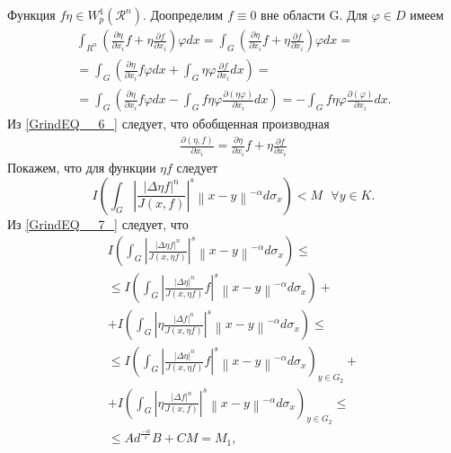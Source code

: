 Функция $f\eta \in W^1_p({\mathcal{R}}^n)$. Доопределим $f\equiv 0$ вне области G. Для $\varphi \in D$ имеем
\begin{equation} \label{GrindEQ__6_}
    \begin{gathered}
    \int_{R^{n} }\left(\frac{\partial \eta }{\partial x_{i} } f+\eta \frac{\partial f}{\partial x_{i} } \right) \varphi dx
    = \int _{G}\left(\frac{\partial \eta }{\partial x_{i} } f+\eta \frac{\partial f}{\partial x_{i} } \right) \varphi dx= \\
    = \int _{G}\left(\frac{\partial \eta }{\partial x_{i} } f\varphi dx+\int _{G}\eta \varphi \frac{\partial f}{\partial x_{i} } dx \right) = \\
    = \int _{G}\left(\frac{\partial \eta }{\partial x_{i} } f\varphi dx-\int _{G}f\eta \varphi \frac{\partial \left(\eta \varphi \right)}{\partial x_{i} } dx \right)
    = -\int _{G}f\eta \varphi \frac{\partial \left(\varphi \right)}{\partial x_{i}}dx.
    \end{gathered}
\end{equation}
Из \ref{GrindEQ__6_} следует, что обобщенная производная 
\begin{equation} \label{GrindEQ__7_}
    \begin{gathered}
        \frac{\partial \left(\eta ,f\right)}{\partial x_i}=\frac{\partial \eta }{\partial x_i}f+\eta \frac{\partial f}{\partial x_i}
    \end{gathered}
\end{equation}
Покажем, что для функции $\eta f$ следует
$$I\left(\int _{G}\left|\frac{\left|\Delta \eta f\right|^{n} }{J\left(x,f\right)} \right|^{s} \left\| x-y\right\| ^{-\alpha }  d\sigma _{x} \right)<M\, \, \, \, \forall y\in K.$$
Из \ref{GrindEQ__7_} следует, что
\begin{equation} \label{GrindEQ__8_}
    \begin{gathered}
        I\left(\int _{G}\left|\frac{\left|\Delta \eta f\right|^{n} }{J\left(x,\eta f\right)} \right|^{s} \left\| x-y\right\| ^{-\alpha }  d\sigma _{x} \right) \le \\
        \le I\left(\int _{G}\left|\frac{\left|\Delta \eta \right|^{n} }{J\left(x,\eta f\right)} f\right|^{s} \left\| x-y\right\| ^{-\alpha }  d\sigma _{x} \right)+ \\
        + I\left(\int _{G}\left|\eta \frac{\left|\Delta f\right|^{n} }{J\left(x,\eta f\right)} \right|^{s} \left\| x-y\right\| ^{-\alpha }  d\sigma _{x} \right)\le \\
        \le I\left(\int _{G}\left|\frac{\left|\Delta \eta \right|^{n} }{J\left(x,\eta f\right)} f\right|^{s} \left\| x-y\right\| ^{-\alpha } d\sigma _{x} \right)_{y\in G_{2} } + \\
        + I\left(\int _{G}\left|\eta \frac{\left|\Delta f\right|^{n} }{J\left(x,f\right)} \right|^{s} \left\| x-y\right\| ^{-\alpha }  d\sigma _{x} \right)_{y\in G_{2} } \le \\
        \le Ad^{\frac{-\alpha }{s} } B+CM=M_{1} ,
    \end{gathered}
\end{equation}
